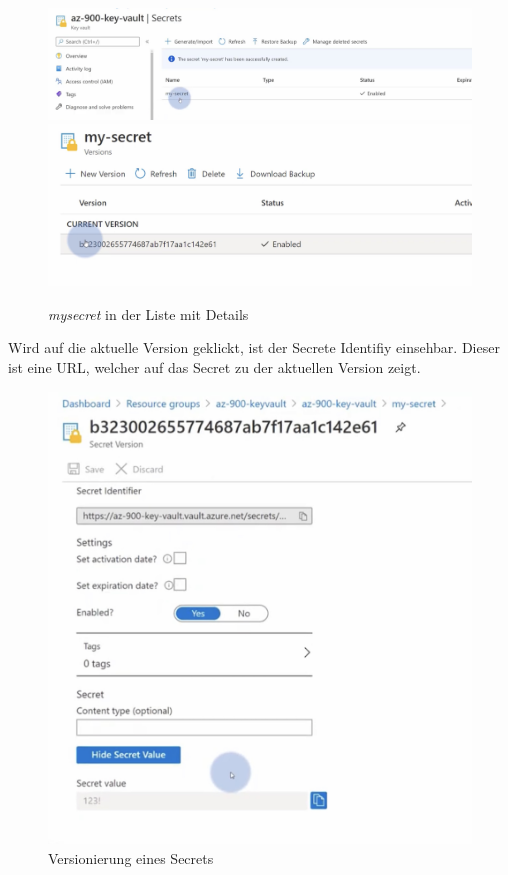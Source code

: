 \begin{figure}[H]
	\centering
	\includegraphics[scale = 0.2]{attachment/chapter_2/Scc134}
	\includegraphics[scale = 0.2]{attachment/chapter_2/Scc135}
	\caption{\textit{mysecret} in der Liste mit Details}
\end{figure}

Wird auf die aktuelle Version geklickt, ist der Secrete Identifiy einsehbar. Dieser ist eine URL, welcher auf das Secret zu der aktuellen Version zeigt.

\begin{figure}[H]
	\centering
	\includegraphics[scale = 0.2]{attachment/chapter_2/Scc136}
	\caption{Versionierung eines Secrets}
\end{figure}
